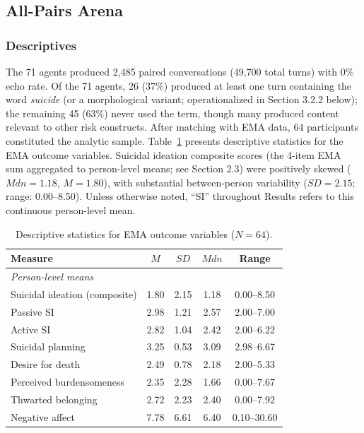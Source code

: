 \documentclass[review,12pt,authoryear]{elsarticle}
\begin{document}
\subsection{All-Pairs Arena}

\subsubsection{Descriptives}

The 71 agents produced 2,485 paired conversations (49,700 total turns) with 0\% echo rate. Of the 71 agents, 26 (37\%) produced at least one turn containing the word \textit{suicide} (or a morphological variant; operationalized in Section 3.2.2 below); the remaining 45 (63\%) never used the term, though many produced content relevant to other risk constructs. After matching with EMA data, 64 participants constituted the analytic sample. Table~\ref{tab:ema_descriptives} presents descriptive statistics for the EMA outcome variables. Suicidal ideation composite scores (the 4-item EMA sum aggregated to person-level means; see Section 2.3) were positively skewed ($Mdn = 1.18$, $M = 1.80$), with substantial between-person variability ($SD = 2.15$; range: 0.00--8.50). Unless otherwise noted, ``SI'' throughout Results refers to this continuous person-level mean.

\begin{table}[H]
\centering
\caption{Descriptive statistics for EMA outcome variables ($N = 64$).}
\label{tab:ema_descriptives}
\begin{tabular}{lcccc}
\toprule
Measure & $M$ & $SD$ & $Mdn$ & Range \\
\midrule
\multicolumn{5}{l}{\textit{Person-level means}} \\
\quad Suicidal ideation (composite) & 1.80 & 2.15 & 1.18 & 0.00--8.50 \\
\quad Passive SI & 2.98 & 1.21 & 2.57 & 2.00--7.00 \\
\quad Active SI & 2.82 & 1.04 & 2.42 & 2.00--6.22 \\
\quad Suicidal planning & 3.25 & 0.53 & 3.09 & 2.98--6.67 \\
\quad Desire for death & 2.49 & 0.78 & 2.18 & 2.00--5.33 \\
\quad Perceived burdensomeness & 2.35 & 2.28 & 1.66 & 0.00--7.67 \\
\quad Thwarted belonging & 2.72 & 2.23 & 2.40 & 0.00--7.92 \\
\quad Negative affect & 7.78 & 6.61 & 6.40 & 0.10--30.60 \\
\bottomrule
\end{tabular}
\end{table}
\end{document}
